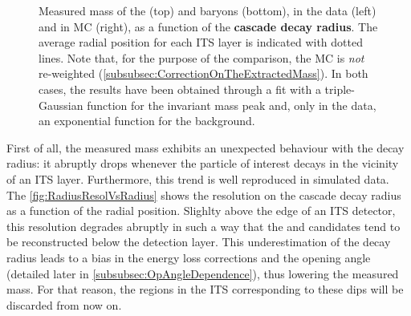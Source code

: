 \begin{figure}[h]
\hspace*{-2.cm}
\hspace*{-2.cm}
\caption{Measured mass of the \rmXi (top) and \rmOmega baryons (bottom), in the data (left) and in MC (right), as a function of the \textbf{cascade decay radius}. The average radial position for each ITS layer is indicated with dotted lines. Note that, for the purpose of the comparison, the MC is \textit{not} re-weighted (\Sec\ref{subsubsec:CorrectionOnTheExtractedMass}). In both cases, the results have been obtained through a fit with a triple-Gaussian function for the invariant mass peak and, only in the data, an exponential function for the background.}
	\label{fig:MassVsRadius}
\end{figure}

First of all, the measured mass exhibits an unexpected behaviour with the decay radius: it abruptly drops whenever the particle of interest decays in the vicinity of an ITS layer. Furthermore, this trend is well reproduced in simulated data. The \fig\ref{fig:RadiusResolVsRadius} shows the resolution on the cascade decay radius as a function of the radial position. Slighlty above the edge of an ITS detector, this resolution degrades abruptly in such a way that the \rmXi and \rmOmega candidates tend to be reconstructed below the detection layer. This underestimation of the decay radius leads to a bias in the energy loss corrections and the opening angle (detailed later in \Sec\ref{subsubsec:OpAngleDependence}), thus lowering the measured mass. For that reason, the regions in the ITS corresponding to these dips will be discarded from now on.\\


